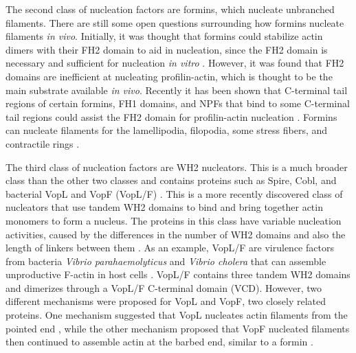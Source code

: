 The second class of nucleation factors are formins, which nucleate unbranched filaments. There are still some open questions surrounding how formins nucleate filaments \textit{in vivo}. Initially, it was thought that formins could stabilize actin dimers with their FH2 domain to aid in nucleation, since the FH2 domain is necessary and sufficient for nucleation \textit{in vitro} \citep{zigmond_formin-induced_2004,paul_role_2008,pring_mechanism_2002}. However, it was found that FH2 domains are inefficient at nucleating profilin-actin, which is thought to be the main substrate available \textit{in vivo}. Recently it has been shown that C-terminal tail regions of certain formins, FH1 domains, and NPFs that bind to some C-terminal tail regions could assist the FH2 domain for profilin-actin nucleation \citep{breitsprecher_formins_2013}. Formins can nucleate filaments for the lamellipodia, filopodia, some stress fibers, and contractile rings \citep{faix_filopodia:_2009,mishra_yeast_2014,blanchoin_actin_2014}.

The third class of nucleation factors are WH2 nucleators. This is a much broader class than the other two classes and contains proteins such as Spire, Cobl, and bacterial VopL and VopF (VopL/F) \citep{quinlan_drosophila_2005, namgoong_mechanism_2011, burke_bacterial_2017,siton-mendelson_functional_2017}. This is a more recently discovered class of nucleators that use tandem WH2 domains to bind and bring together actin monomers to form a nucleus. The proteins in this class have variable nucleation activities, caused by the differences in the number of WH2 domains and also the length of linkers between them \citep{siton-mendelson_functional_2017}. As an example, VopL/F are virulence factors from bacteria \textit{Vibrio parahaemolyticus} and \textit{Vibrio cholera} that can assemble unproductive F-actin in host cells \citep{liverman_arp2/3-independent_2007}. VopL/F contains three tandem WH2 domains and dimerizes through a VopL/F C-terminal domain (VCD). However, two different mechanisms were proposed for VopL and VopF, two closely related proteins. One mechanism suggested that VopL nucleates actin filaments from the pointed end \citep{namgoong_mechanism_2011,yu_mechanism_2011,zahm_bacterial_2013}, while the other mechanism proposed that VopF nucleated filaments then continued to assemble actin at the barbed end, similar to a formin \citep{pernier_dimeric_2013}.

